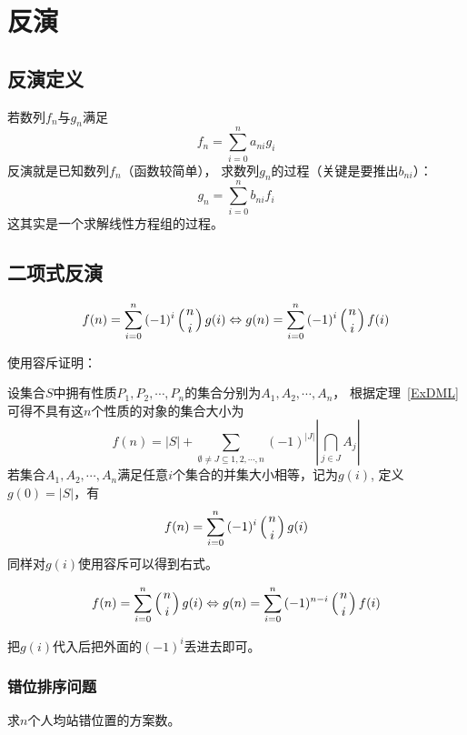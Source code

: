 \section{反演}
\subsection{反演定义}
若数列${f_n}$与${g_n}$满足
\begin{displaymath}
	f_n=\sum_{i=0}^n{a_{ni}g_i}
\end{displaymath}
反演就是已知数列${f_n}$（函数较简单），
求数列${g_n}$的过程（关键是要推出$b_{ni}$）：
\begin{displaymath}
	g_n=\sum_{i=0}^n{b_{ni}f_i}
\end{displaymath}
这其实是一个求解线性方程组的过程。
\subsection{二项式反演}\label{BI}
\begin{theorem}
	\begin{displaymath}
		f(n)=\sum_{i=0}^n{(-1)^i\left(n \atop i\right)g(i)}
		\Leftrightarrow g(n)=\sum_{i=0}^n{(-1)^i\left(n \atop i\right)f(i)}
	\end{displaymath}
\end{theorem}
使用容斥证明：

设集合$S$中拥有性质$P_1,P_2,\cdots,P_n$的集合分别为$A_1,A_2,\cdots,A_n$，
根据定理~\ref{ExDML}可得不具有这$n$个性质的对象的集合大小为
\begin{displaymath}
	f(n)=|S|+\sum_{\emptyset \neq J\subseteq{1,2,\cdots,n}}
	{(-1)^{|J|}\left|\bigcap_{j\in J}{A_j}\right|}
\end{displaymath}
若集合$A_1,A_2,\cdots,A_n$满足任意$i$个集合的并集大小相等，记为$g(i)$,
定义$g(0)=|S|$，有
\begin{displaymath}
	f(n)=\sum_{i=0}^n{(-1)^i \left(n \atop i\right)g(i)}
\end{displaymath}
同样对$g(i)$使用容斥可以得到右式。
\begin{inference}\label{BII}
	\begin{displaymath}
		f(n)=\sum_{i=0}^n{\left(n \atop i\right)g(i)}
		\Leftrightarrow g(n)=\sum_{i=0}^n{(-1)^{n-i}\left(n \atop i\right)f(i)}
	\end{displaymath}
\end{inference}
把$g(i)$代入后把外面的$(-1)^i$丢进去即可。
\subsubsection{错位排序问题}
求$n$个人均站错位置的方案数。

